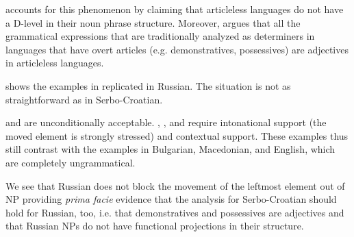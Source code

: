 \documentclass[output=paper,
colorlinks,
citecolor=brown,
newtxmath
]{langscibook}
\begin{document}
\noindent \citet{Boskovic2005a} accounts for this phenomenon by claiming that articleless languages do not have a D-level in their noun phrase structure. Moreover, \citeauthor{Boskovic2005a} argues that all the grammatical expressions that are traditionally analyzed as determiners in languages that have overt articles (e.g. demonstratives, possessives) are adjectives in articleless languages.

 shows the examples in  replicated in Russian. The situation is not as straightforward as in Serbo-Croatian.


\ea\label{Russian}      %
\z\z

\noindent {} and  are unconditionally acceptable. , , and  require intonational support (the moved element is strongly stressed) and contextual support. These examples thus still contrast with the examples in Bulgarian, Macedonian, and English, which are completely ungrammatical. 

We see that Russian does not block the movement of the leftmost element out of NP providing \textit{prima facie} evidence that the analysis for Serbo-Croatian should hold for Russian, too, i.e. that demonstratives and possessives are adjectives and that Russian NPs do not have functional projections in their structure.
\end{document}
